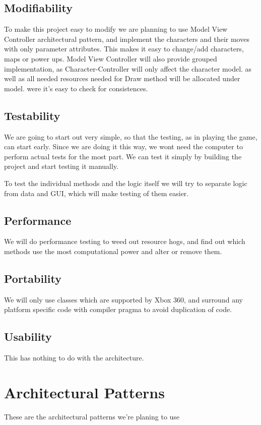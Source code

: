 \section{Modifiability}
To make this project easy to modify we are planning to use Model View Controller architectural pattern, and implement the characters and their moves with only parameter attributes. This makes it easy to change/add characters, maps  or power ups. Model View Controller will also provide grouped implementation, as Character-Controller will only affect the character model. as well as all needed resources needed for Draw method will be allocated under model. were it’s easy to check for consistences.

\section{Testability}
We are going to start out very simple, so that the testing, as in playing the game, can start early. Since we are doing it this way, we wont need the computer to perform actual tests for the most part. We can test it simply by building the project and start testing it manually.

To test the individual methods and the logic itself we will try to separate logic from data and GUI, which will make testing of them easier.

\section{Performance}
We will do performance testing to weed out resource hogs, and find out which methods use the most computational power and alter or remove them.

\section{Portability}
We will only use classes which are supported by Xbox 360, and surround any platform specific code with compiler pragma to avoid duplication of code.

\section{Usability}
This has nothing to do with the architecture.

\chapter{Architectural Patterns}
These are the architectural patterns we're planing to use 
